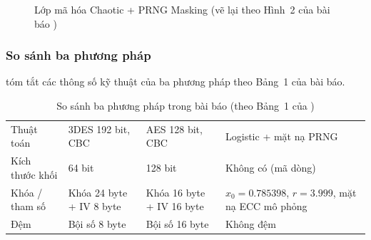 \begin{figure}[H]
\centering
{}
\caption{Lớp mã hóa Chaotic + PRNG Masking (vẽ lại theo Hình~2 của bài báo \cite{raut2026hybrid})}
\label{fig:paper-chaotic}
\end{figure}

\subsubsection{So sánh ba phương pháp}

 tóm tắt các thông số kỹ thuật của ba phương pháp theo Bảng~1 của bài báo.

\begin{table}[H]
\centering
\caption{So sánh ba phương pháp trong bài báo (theo Bảng~1 của \cite{raut2026hybrid})}
\label{tab:paper-table1}
\small
\begin{tabularx}{\linewidth}{@{}P{2.6cm}LLL@{}}
\toprule
{} &  &  & \\
\midrule
Thuật toán & 3DES 192 bit, CBC & AES 128 bit, CBC & Logistic + mặt nạ PRNG\\
Kích thước khối & 64 bit & 128 bit & Không có (mã dòng)\\
Khóa / tham số & Khóa 24 byte + IV 8 byte & Khóa 16 byte + IV 16 byte & $x_0 = 0.785398$, $r = 3.999$, mặt nạ ECC mô phỏng\\
Đệm & Bội số 8 byte & Bội số 16 byte & Không đệm\\
\bottomrule
\end{tabularx}
\end{table}

